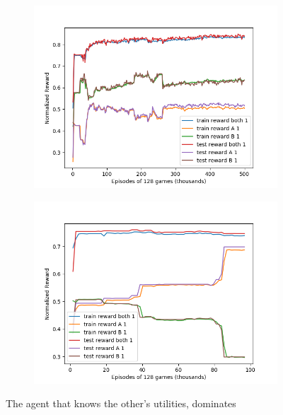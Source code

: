 \documentclass{article}
\begin{document}
\begin{figure}[h]
    \centering
    \begin{subfigure}{.5\textwidth}
    \begin{center}
        \includegraphics[width=0.9\linewidth]{opp-util-0.png}
    \end{center}
    \end{subfigure}%
    \begin{subfigure}{.5\textwidth}
    \begin{center}
        \includegraphics[width=0.9\linewidth]{opp-util-1.png}
    \end{center}
    \end{subfigure}
    \label{fig:self-opp-util}
    \caption{The agent that knows the other's utilities, dominates}
\end{figure}
\end{document}
